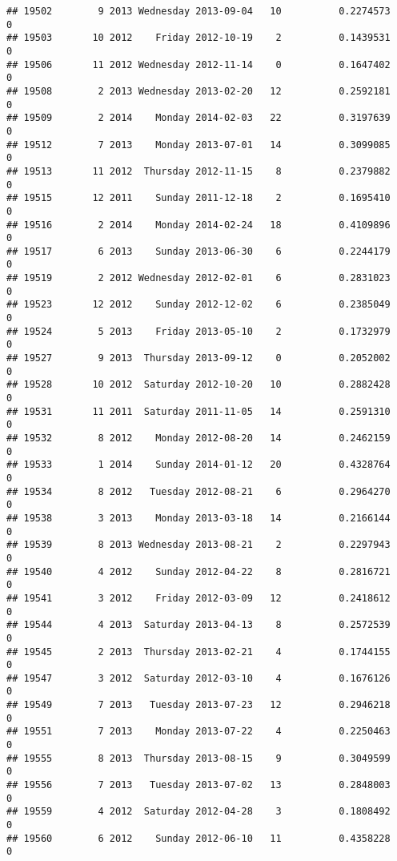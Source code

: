 \documentclass[
]{article}
\begin{document}
\begin{verbatim}
## 19502        9 2013 Wednesday 2013-09-04   10          0.2274573             0
## 19503       10 2012    Friday 2012-10-19    2          0.1439531             0
## 19506       11 2012 Wednesday 2012-11-14    0          0.1647402             0
## 19508        2 2013 Wednesday 2013-02-20   12          0.2592181             0
## 19509        2 2014    Monday 2014-02-03   22          0.3197639             0
## 19512        7 2013    Monday 2013-07-01   14          0.3099085             0
## 19513       11 2012  Thursday 2012-11-15    8          0.2379882             0
## 19515       12 2011    Sunday 2011-12-18    2          0.1695410             0
## 19516        2 2014    Monday 2014-02-24   18          0.4109896             0
## 19517        6 2013    Sunday 2013-06-30    6          0.2244179             0
## 19519        2 2012 Wednesday 2012-02-01    6          0.2831023             0
## 19523       12 2012    Sunday 2012-12-02    6          0.2385049             0
## 19524        5 2013    Friday 2013-05-10    2          0.1732979             0
## 19527        9 2013  Thursday 2013-09-12    0          0.2052002             0
## 19528       10 2012  Saturday 2012-10-20   10          0.2882428             0
## 19531       11 2011  Saturday 2011-11-05   14          0.2591310             0
## 19532        8 2012    Monday 2012-08-20   14          0.2462159             0
## 19533        1 2014    Sunday 2014-01-12   20          0.4328764             0
## 19534        8 2012   Tuesday 2012-08-21    6          0.2964270             0
## 19538        3 2013    Monday 2013-03-18   14          0.2166144             0
## 19539        8 2013 Wednesday 2013-08-21    2          0.2297943             0
## 19540        4 2012    Sunday 2012-04-22    8          0.2816721             0
## 19541        3 2012    Friday 2012-03-09   12          0.2418612             0
## 19544        4 2013  Saturday 2013-04-13    8          0.2572539             0
## 19545        2 2013  Thursday 2013-02-21    4          0.1744155             0
## 19547        3 2012  Saturday 2012-03-10    4          0.1676126             0
## 19549        7 2013   Tuesday 2013-07-23   12          0.2946218             0
## 19551        7 2013    Monday 2013-07-22    4          0.2250463             0
## 19555        8 2013  Thursday 2013-08-15    9          0.3049599             0
## 19556        7 2013   Tuesday 2013-07-02   13          0.2848003             0
## 19559        4 2012  Saturday 2012-04-28    3          0.1808492             0
## 19560        6 2012    Sunday 2012-06-10   11          0.4358228             0

\end{verbatim}
\end{document}
